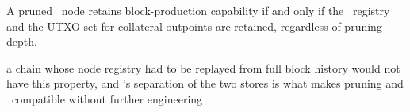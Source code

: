 \begin{property}
A pruned \PoN\ node retains block-production capability if and only if the \FluxNode\ registry and the
UTXO set for collateral outpoints are retained, regardless of pruning depth.
\end{property}

 a chain whose node registry had to be replayed from full
block history would not have this property, and \fluxd's separation of the two stores is what makes
pruning and \PoN\ compatible without further engineering \shipped\
.

